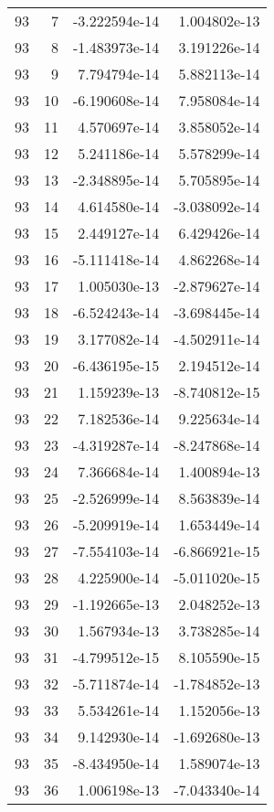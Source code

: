\begin{tabular}{rrrr}
  93 &    7 & -3.222594e-14 &  1.004802e-13 \\
  93 &    8 & -1.483973e-14 &  3.191226e-14 \\
  93 &    9 &  7.794794e-14 &  5.882113e-14 \\
  93 &   10 & -6.190608e-14 &  7.958084e-14 \\
  93 &   11 &  4.570697e-14 &  3.858052e-14 \\
  93 &   12 &  5.241186e-14 &  5.578299e-14 \\
  93 &   13 & -2.348895e-14 &  5.705895e-14 \\
  93 &   14 &  4.614580e-14 & -3.038092e-14 \\
  93 &   15 &  2.449127e-14 &  6.429426e-14 \\
  93 &   16 & -5.111418e-14 &  4.862268e-14 \\
  93 &   17 &  1.005030e-13 & -2.879627e-14 \\
  93 &   18 & -6.524243e-14 & -3.698445e-14 \\
  93 &   19 &  3.177082e-14 & -4.502911e-14 \\
  93 &   20 & -6.436195e-15 &  2.194512e-14 \\
  93 &   21 &  1.159239e-13 & -8.740812e-15 \\
  93 &   22 &  7.182536e-14 &  9.225634e-14 \\
  93 &   23 & -4.319287e-14 & -8.247868e-14 \\
  93 &   24 &  7.366684e-14 &  1.400894e-13 \\
  93 &   25 & -2.526999e-14 &  8.563839e-14 \\
  93 &   26 & -5.209919e-14 &  1.653449e-14 \\
  93 &   27 & -7.554103e-14 & -6.866921e-15 \\
  93 &   28 &  4.225900e-14 & -5.011020e-15 \\
  93 &   29 & -1.192665e-13 &  2.048252e-13 \\
  93 &   30 &  1.567934e-13 &  3.738285e-14 \\
  93 &   31 & -4.799512e-15 &  8.105590e-15 \\
  93 &   32 & -5.711874e-14 & -1.784852e-13 \\
  93 &   33 &  5.534261e-14 &  1.152056e-13 \\
  93 &   34 &  9.142930e-14 & -1.692680e-13 \\
  93 &   35 & -8.434950e-14 &  1.589074e-13 \\
  93 &   36 &  1.006198e-13 & -7.043340e-14 \\

\end{tabular}
